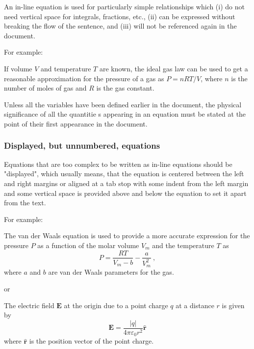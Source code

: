 An in-line equation is used for particularly simple relationships which (i) do not need vertical space for integrals, fractions, etc., (ii) can be expressed without breaking the flow of the sentence, and (iii) will not be referenced again in the document.

For example:

\begin{IMleftrightskip}
If volume $V$ and temperature $T$ are known, the ideal gas law can be used to get a reasonable approximation for the pressure of a gas as $P=nRT/V$, where $n$ is the number of moles of gas and $R$ is the gas constant.
\end{IMleftrightskip}

Unless all the variables have been defined earlier in the document, the physical significance of all the quantitie s appearing in an equation must be stated at the point of their first appearance in the document.

\subsubsection{Displayed, but unnumbered, equations}
\label{sec:diuneq}

Equations that are too complex to be written as in-line equations should be "displayed", which usually means, that the equation is centered between the left and right margins or aligned at a tab stop
with some indent from the left margin and some vertical space is provided above and below the equation to set it apart from the text.

For example:


\begin{IMleftrightskip}
The van der Waals equation is used to provide a more accurate expression for the pressure $P$ as a function of the molar volume $V_m$ and the temperature $T$ as
%
\begin{equation*}
P = \frac{RT}{V_m-b}-\frac{a}{V_m^2}~,
\end{equation*}
%
where $a$ and $b$ are van der Waals parameters for the gas.

or

The electric field $\mathbf{E}$ at the origin due to a point charge $q$ at a distance $r$ is given by
%
\begin{equation*}
\mathbf{E} = \frac{|q|}{4\pi\varepsilon_0 r^2}\mathbf{\hat{r}}
\end{equation*}
where $\mathbf{\hat{r}}$ is the position vector of the point charge.
\end{IMleftrightskip}

